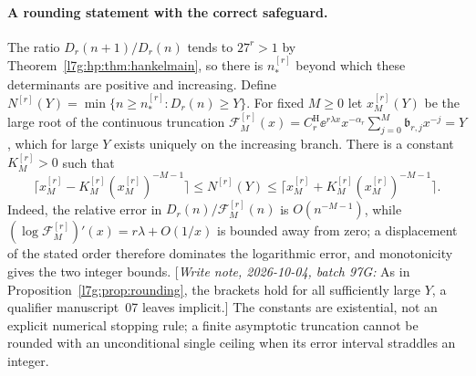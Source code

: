 \documentclass[11pt,letterpaper]{article}
\theoremstyle{remark}\newtheorem{remark}[theorem]{Remark}
\newcommand{\hpnote}[1]{\textup{[}\emph{Write note, 2026-10-04, batch 97G:} #1\textup{]}}
\newcounter{l7gtrsavedeq}
\begin{document}
\paragraph{A rounding statement with the correct safeguard.}
The ratio $D_r(n+1)/D_r(n)$ tends to $27^r>1$ by
Theorem~\ref{l7g:hp:thm:hankelmain}, so there is $n^{[r]}_*$ beyond which
these determinants are positive and increasing. Define
$N^{[r]}(Y)=\min\{n\ge n^{[r]}_*:D_r(n)\ge Y\}$. For fixed $M\ge0$ let
$x^{[r]}_M(Y)$ be the large root of the continuous truncation
$\mathcal F^{[r]}_M(x)=C^{\mathrm H}_r\ee^{r\lambda x}x^{-\alpha_r}
\sum_{j=0}^M\mathfrak b_{r,j}x^{-j}=Y$, which for large $Y$ exists uniquely
on the increasing branch. There is a constant $K^{[r]}_M>0$ such that
\begin{equation}\label{l7g:hp:eq:rounding}
 \bigl\lceil x^{[r]}_M-K^{[r]}_M(x^{[r]}_M)^{-M-1}\bigr\rceil
 \le N^{[r]}(Y)\le
 \bigl\lceil x^{[r]}_M+K^{[r]}_M(x^{[r]}_M)^{-M-1}\bigr\rceil.
\end{equation}
Indeed, the relative error in $D_r(n)/\mathcal F^{[r]}_M(n)$ is
$O(n^{-M-1})$, while $(\log\mathcal F^{[r]}_M)'(x)=r\lambda+O(1/x)$ is
bounded away from zero; a displacement of the stated order therefore
dominates the logarithmic error, and monotonicity gives the two integer
bounds. \hpnote{As in Proposition~\ref{l7g:prop:rounding}, the brackets hold
for all sufficiently large $Y$, a qualifier manuscript~07 leaves implicit.}
The constants are existential, not an explicit numerical stopping rule; a
finite asymptotic truncation cannot be rounded with an unconditional single
ceiling when its error interval straddles an integer.
\end{document}
